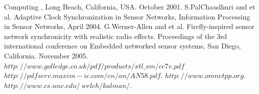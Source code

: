 \documentclass[a4paper,10pt]{report}
\begin{document}
\begin{thebibliography}{\textbf{References}}
Computing , Long Beach, California, USA. October 2001.
S.PalChaudhuri and et al. Adaptive Clock Synchronization in Sensor Networks, Information Processing in Sensor Networks, April 2004.
G.Werner-Allen and et al. Firefly-inspired sensor network synchronicity with realistic radio effects. Proceedings of the 3rd international conference on Embedded networked sensor systems, San Diego, California. November 2005.
 $http://www.golledge.co.uk/pdf/products/xtl\_sm/cc7v.pdf$
 $http://pdfserv.maxim-ic.com/en/an/AN58.pdf$.
$http://www.omnetpp.org$.
$http://www.cs.unc.edu/~welch/kalman/$.
\end{thebibliography}
\end{document}

